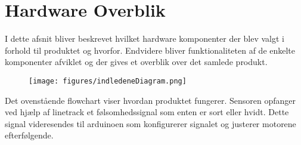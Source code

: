 \section{Hardware Overblik}

I dette afsnit bliver beskrevet hvilket hardware komponenter der blev valgt i forhold til produktet og hvorfor. Endvidere bliver funktionaliteten af de enkelte komponenter afviklet og der gives et overblik over det samlede produkt.

\begin{figure}[h!]
  \centering
  \texttt{[image: figures/indledeneDiagram.png]}
\end{figure}

Det ovenstående flowchart viser hvordan produktet fungerer. Sensoren opfanger ved hjælp af linetrack et følsomhedssignal som enten er sort eller hvidt. Dette signal videresendes til arduinoen som konfigurerer signalet og justerer motorene efterfølgende.